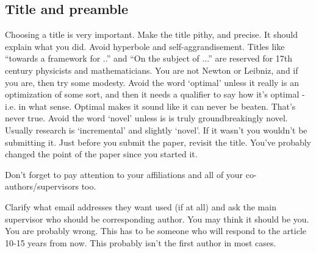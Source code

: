 
\subsection{Title and preamble}
Choosing a title is very important. Make the title pithy, and precise. It should explain what you did. Avoid hyperbole and self-aggrandisement. Titles like ``towards a framework for ..'' and ``On the subject of ...'' are reserved for 17th century physicists and mathematicians. You are not Newton or Leibniz, and if you are, then try some modesty. Avoid the word `optimal’ unless it really is an optimization of some sort, and then it needs a qualifier to say how it’s optimal - i.e. in what sense. Optimal makes it sound like it can never be beaten. That’s never true. Avoid the word `novel’ unless is is truly groundbreakingly novel. Usually research is `incremental’ and slightly `novel’. If it wasn’t you wouldn’t be submitting it. Just before you submit the paper, revisit the title. You’ve probably changed the point of the paper since you started it.

Don't forget to pay attention to your affiliations and all of your co-authors/supervisors too.


Clarify what email addresses they want used (if at all) and ask the main supervisor who should be corresponding author. You may think it should be you. You are probably wrong. This has to be someone who will respond to the article 10-15 years from now. This probably isn't the first author in most cases.


